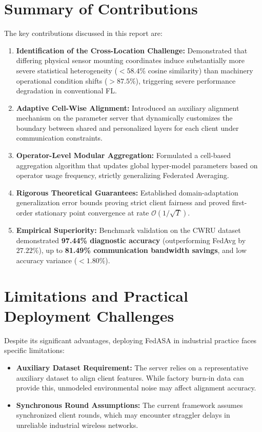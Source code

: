 \documentclass[12pt,a4paper]{report}
\begin{document}
\section{Summary of Contributions}
The key contributions discussed in this report are:
\begin{enumerate}
    \item \textbf{Identification of the Cross-Location Challenge:} Demonstrated that differing physical sensor mounting coordinates induce substantially more severe statistical heterogeneity ($<58.4\%$ cosine similarity) than machinery operational condition shifts ($>87.5\%$), triggering severe performance degradation in conventional FL.
    \item \textbf{Adaptive Cell-Wise Alignment:} Introduced an auxiliary alignment mechanism on the parameter server that dynamically customizes the boundary between shared and personalized layers for each client under communication constraints.
    \item \textbf{Operator-Level Modular Aggregation:} Formulated a cell-based aggregation algorithm that updates global hyper-model parameters based on operator usage frequency, strictly generalizing Federated Averaging.
    \item \textbf{Rigorous Theoretical Guarantees:} Established domain-adaptation generalization error bounds proving strict client fairness and proved first-order stationary point convergence at rate $\mathcal{O}(1/\sqrt{T})$.
    \item \textbf{Empirical Superiority:} Benchmark validation on the CWRU dataset demonstrated \textbf{97.44\% diagnostic accuracy} (outperforming FedAvg by $27.22\%$), up to \textbf{81.49\% communication bandwidth savings}, and low accuracy variance ($<1.80\%$).
\end{enumerate}

\section{Limitations and Practical Deployment Challenges}
Despite its significant advantages, deploying FedASA in industrial practice faces specific limitations:
\begin{itemize}
    \item \textbf{Auxiliary Dataset Requirement:} The server relies on a representative auxiliary dataset to align client features. While factory burn-in data can provide this, unmodeled environmental noise may affect alignment accuracy.
    \item \textbf{Synchronous Round Assumptions:} The current framework assumes synchronized client rounds, which may encounter straggler delays in unreliable industrial wireless networks.
\end{itemize}
\end{document}
